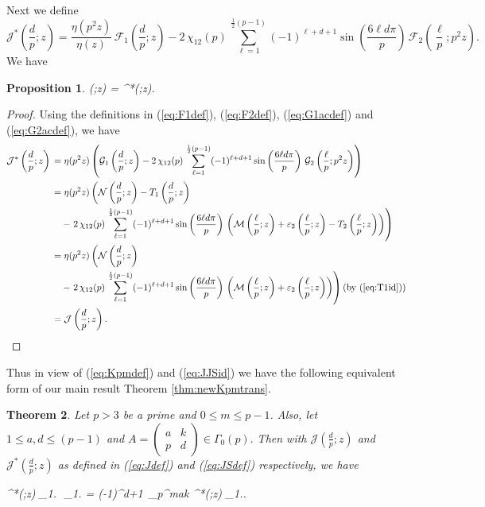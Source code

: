 \documentclass[12pt]{amsart}
\newtheorem{theorem}{Theorem}[section]
\newtheorem{prop}[theorem]{Proposition}
\theoremstyle{definition}
\theoremstyle{remark}
\numberwithin{equation}{section}
\newcommand\Lpar[1]{\left(#1\right)}
\newcommand\Mell[3]{\mathcal{M}\left(\frac{#1}{#2};#3\right)}
\newcommand\Nell[3]{\mathcal{N}\left(\frac{#1}{#2};#3\right)}
\newcommand\Fell[4]{\mathcal{F}_{#1}\left(\frac{#2}{#3};#4\right)}
\newcommand\Gell[4]{\mathcal{G}_{#1}\left(\frac{#2}{#3};#4\right)}
\newcommand\Jdpz[1]{\mathcal{J}\left(\frac{d}{p};{#1}\right)}
\newcommand\JSdpz[1]{\mathcal{J}^{*}\left(\frac{d}{p};{#1}\right)}
\newcommand\strokeb[2]{\,\left\arrowvert\,\left[#1\right]_#2\right.}
\newcommand\stroke[3]{#1\,\left\arrowvert\,\left[#2\right]_{#3}\right.}
\newcommand\thm[1]{\ref{thm:#1}}
\newcommand\eqn[1]{(\ref{eq:#1})}
\begin{document}
Next we define
\\
\begin{equation}   
\JSdpz{z}{} 
= \frac{\eta(p^2 z)}{\eta(z)} \, \Fell{1}{d}{p}{z}
 - 
2\,\chi_{12}(p) \,
\sum_{\ell=1}^{\frac{1}{2}(p-1)} (-1)^{\ell + d + 1} 
\sin\Lpar{\frac{6\ell d\pi}{p}} \,
\Fell{2}{\ell}{p}{p^2 z}.
\label{eq:JSdef}
\end{equation}   
We have
\begin{prop}
\label{propo:JJSid}
\beq
\Jdpz{z}{} =
\JSdpz{z}{}.
\label{eq:JJSid}
\eeq
\end{prop}
\begin{proof}
Using the definitions in \eqn{F1def}, \eqn{F2def}, \eqn{G1acdef} and \eqn{G2acdef}, we have
\begin{align*}
\JSdpz{z}{} &= \eta(p^2 z)\Lpar{\Gell{1}{d}{p}{z}
 - 
2\,\chi_{12}(p) \,
\sum_{\ell=1}^{\frac{1}{2}(p-1)} (-1)^{\ell + d + 1} 
\sin\Lpar{\frac{6\ell d\pi}{p}} \,
\Gell{2}{\ell}{p}{p^2 z}}\\
&= \eta(p^2 z)\left(\Nell{d}{p}{z} - T_1\Lpar{\frac{d}{p};z}\right.\\
&\quad
 - 
\left.2\,\chi_{12}(p) \,
\sum_{\ell=1}^{\frac{1}{2}(p-1)} (-1)^{\ell + d + 1} 
\sin\Lpar{\frac{6\ell d\pi}{p}} \,
\Lpar{\Mell{\ell}{p}{z} + \varepsilon_2\Lpar{\frac{\ell}{p};z}
- T_2\Lpar{\frac{\ell}{p};z}}\right)\\
&= \eta(p^2 z)\left(\Nell{d}{p}{z} \right.\\
&\quad
 - 
\left.2\,\chi_{12}(p) \,
\sum_{\ell=1}^{\frac{1}{2}(p-1)} (-1)^{\ell + d + 1} 
\sin\Lpar{\frac{6\ell d\pi}{p}} \,
\Lpar{\Mell{\ell}{p}{z} + \varepsilon_2\Lpar{\frac{\ell}{p};z}}
\right) 
\mbox{(by \eqn{T1id})}
\\
&=\Jdpz{z}{}.
\end{align*}
\end{proof}


Thus in view of \eqn{Kpmdef} and \eqn{JJSid} we have the following equivalent form of our main result Theorem \thm{newKpmtrans}.

\begin{theorem}\label{thm:Kpmid}
Let $p>3$ be a prime and $0 \le m \le p-1$. Also, let $1 \le a,d \le (p-1)$ and
$A = \begin{pmatrix}
      a & k \\ p & d 
    \end{pmatrix}
\in \Gamma_0(p).
$ Then with $\Jdpz{z}{}$ and $\JSdpz{z}{}$ as defined in \eqn{Jdef} and \eqn{JSdef} respectively, we have

\beq
\stroke{\JSdpz{z}{}}{U_{p,m}}{1} \strokeb{A}{1}
= 
(-1)^{d+1}\,
\zeta_p^{mak} 
\stroke{\JSdpz{z}{}}{U_{p,ma^2}}{1}.
\label{eq:eqnKpmid}
\eeq\\
\end{theorem}
\end{document}

